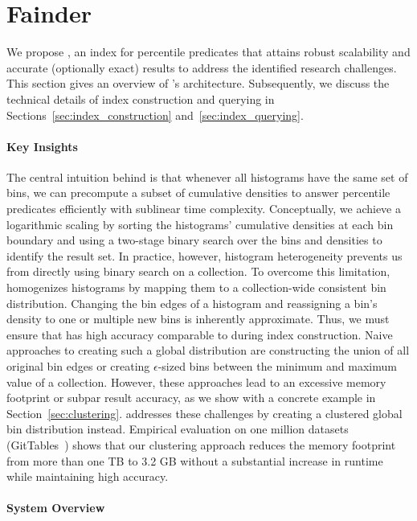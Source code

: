 
\section{Fainder}
\label{sec:index_overview}

We propose \system{}, an index for percentile predicates that attains robust scalability and accurate (optionally exact) results to address the identified research challenges.
This section gives an overview of \system{}'s architecture.
Subsequently, we discuss the technical details of index construction and querying in Sections~\ref{sec:index_construction} and~\ref{sec:index_querying}.

\paragraph{Key Insights}
The central intuition behind \system{} is that whenever all histograms have the same set of bins, we can precompute a subset of cumulative densities to answer percentile predicates efficiently with sublinear time complexity.
Conceptually, we achieve a logarithmic scaling by sorting the histograms' cumulative densities at each bin boundary and using a two-stage binary search over the bins and densities to identify the result set.
In practice, however, histogram heterogeneity prevents us from directly using binary search on a collection.
To overcome this limitation, \system{} homogenizes histograms by mapping them to a collection-wide consistent bin distribution.
Changing the bin edges of a histogram and reassigning a bin's density to one or multiple new bins is inherently approximate.
Thus, we must ensure that \system{} has high accuracy comparable to \pscan during index construction.
Naive approaches to creating such a global distribution are constructing the union of all original bin edges or creating $\epsilon$-sized bins between the minimum and maximum value of a collection.
However, these approaches lead to an excessive memory footprint or subpar result accuracy, as we show with a concrete example in Section~\ref{sec:clustering}.
\system{} addresses these challenges by creating a clustered global bin distribution instead.
Empirical evaluation on one million datasets (GitTables~\cite{hulsebos_gittables_2023}) shows that our clustering approach reduces the memory footprint from more than one TB to 3.2 GB without a substantial increase in runtime while maintaining high accuracy.

\paragraph{System Overview}

